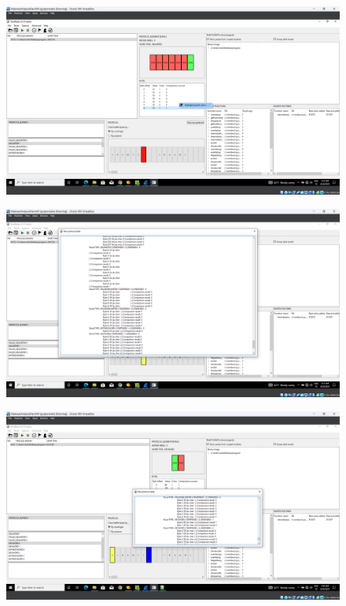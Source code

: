 \documentclass[conference]{IEEEtran}
\begin{document}
\begin{figure}
    \centerline{\includegraphics[width=\textwidth]{images/sch_s5.png}}
    \caption{}
    \label{figure:ap_sch_s5}
\end{figure}

\begin{figure}
    \centerline{\includegraphics[width=\textwidth]{images/sch_s6.png}}
    \caption{}
    \label{figure:ap_sch_s6}
\end{figure}


\begin{figure}
    \centerline{\includegraphics[width=\textwidth]{images/sch_s7.png}}
    \caption{}
    \label{figure:ap_sch_s7}
\end{figure}
\end{document}
